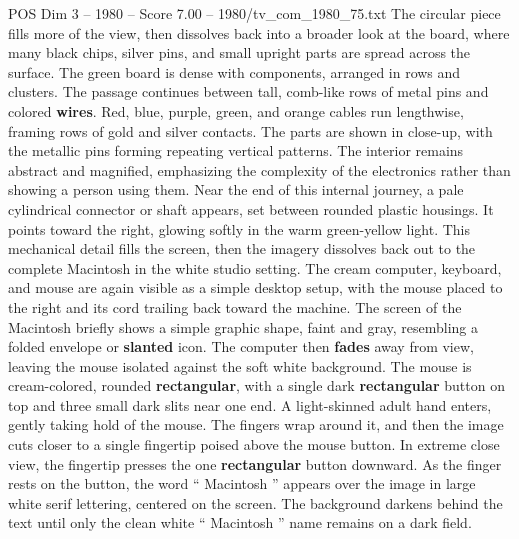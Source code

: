 \begin{textsample}{POS Dim 3 – 1980 – Score 7.00 – 1980/tv\_com\_1980\_75.txt}
The circular piece fills more of the view, then dissolves back into a broader look at the board, where many black chips, silver pins, and small upright parts are spread across the surface.
The green board is dense with components, arranged in rows and clusters.
The passage continues between tall, comb-like rows of metal pins and colored \textbf{wires}.
Red, blue, purple, green, and orange cables run lengthwise, framing rows of gold and silver contacts.
The parts are shown in close-up, with the metallic pins forming repeating vertical patterns.
The interior remains abstract and magnified, emphasizing the complexity of the electronics rather than showing a person using them.
Near the end of this internal journey, a pale cylindrical connector or shaft appears, set between rounded plastic housings.
It points toward the right, glowing softly in the warm green-yellow light.
This mechanical detail fills the screen, then the imagery dissolves back out to the complete Macintosh in the white studio setting.
The cream computer, keyboard, and mouse are again visible as a simple desktop setup, with the mouse placed to the right and its cord trailing back toward the machine.
The screen of the Macintosh briefly shows a simple graphic shape, faint and gray, resembling a folded envelope or \textbf{slanted} icon.
The computer then \textbf{fades} away from view, leaving the mouse isolated against the soft white background.
The mouse is cream-colored, rounded \textbf{rectangular}, with a single dark \textbf{rectangular} button on top and three small dark slits near one end.
A light-skinned adult hand enters, gently taking hold of the mouse.
The fingers wrap around it, and then the image cuts closer to a single fingertip poised above the mouse button.
In extreme close view, the fingertip presses the one \textbf{rectangular} button downward.
As the finger rests on the button, the word “ Macintosh ” appears over the image in large white serif lettering, centered on the screen.
The background darkens behind the text until only the clean white “ Macintosh ” name remains on a dark field.

\end{textsample}
